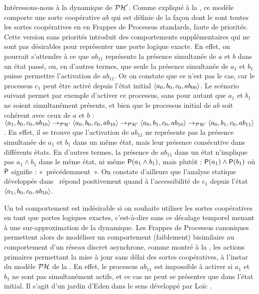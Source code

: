 \begin{example}
  Intéressons-nous à la dynamique de $\PH'$.
  Comme expliqué à la ,
  ce modèle comporte une sorte coopérative $ab$ qui est définie de la façon
  dont le sont toutes les sortes coopératives en
  en Frappes de Processus standards, faute de priorités.
  Cette version sans priorités introduit des comportements supplémentaires qui ne sont pas
  désirables pour représenter une porte logique exacte.
  En effet, on pourrait s'attendre à ce que $ab_{11}$ représente la présence simultanée
  de $a$ et $b$ dans un état passé,
  ou, en d'autres termes, que seule la présence simultanée de $a_1$ et $b_1$ puisse
  permettre l'activation de $ab_{11}$.
  Or on constate que ce n'est pas le cas, car le processus $c_1$ peut être
  activé depuis l'état initial $\etat{a_0, b_0, c_0, ab_{00}}$.
  Le scénario suivant permet par exemple d'activer
  ce processus, sans pour autant que $a_1$ et $b_1$ ne soient simultanément présents,
  et bien que le processus initial de $ab$ soit cohérent avec ceux de $a$ et $b$ :
  $\PHstate{a_1, b_0, c_0, ab_{10}} \PHtrans[\PH']
  \PHstate{a_0, b_0, c_0, ab_{10}} \PHtrans[\PH']
  \PHstate{a_0, b_1, c_0, ab_{10}} \PHtrans[\PH']
  \PHstate{a_0, b_1, c_0, ab_{11}}$.
  En effet, il se trouve que l'activation de $ab_{11}$ ne représente pas la présence simultanée
  de $a_1$ et $b_1$ dans un même état, mais leur présence consécutive dans
  différents états.
  En d'autres termes, la présence de $ab_{11}$ dans un état n'implique pas
  $a_1 \wedge b_1$ dans le même état, ni même
  $\tempop(a_1 \wedge b_1)$, mais plutôt : $\tempop(a_1) \wedge \tempop(b_1)$
  où $\tempop$ signifie : «~précédemment~».
  On constate d'ailleurs que l'analyse statique développée dans~\cite{PMR12-MSCS}
  répond positivement quand à l'accessibilité de $c_1$ depuis l'état
  $\PHstate{a_1, b_0, c_0, ab_{10}}$.
  
  Un tel comportement est indésirable si on souhaite utiliser les sortes coopératives en tant
  que portes logiques exactes, c'est-à-dire sans ce décalage temporel menant à une sur-approximation
  de la dynamique.
  Les Frappes de Processus canoniques permettent alors de modéliser un comportement (faiblement)
  bisimilaire au comportement d'un réseau discret asynchrone,
  comme montré à la ,
  les actions primaires permettant la mise à jour
  sans délai des sortes coopératives, à l'instar du modèle $\PH$ de la .
  En effet, le processus $ab_{11}$ est impossible à activer si $a_1$ et $b_1$ ne sont
  pas simultanément actifs, et ce cas ne peut se présenter que dans l'état initial.
  Il s'agit d'un jardin d'Eden dans le sens développé par
  Loïc \cite[p.~123]{Pauleve11}.
  

\end{example}
